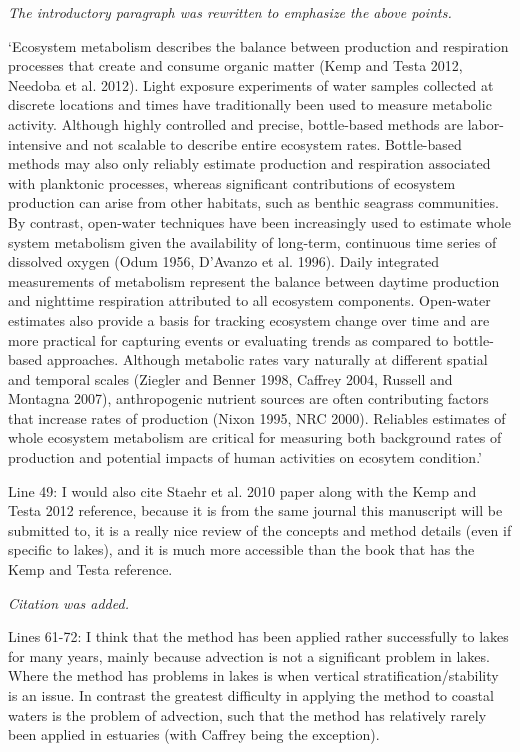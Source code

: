 \documentclass[letterpaper,12pt]{article}\usepackage[]{graphicx}\usepackage[]{color}
\begin{document}
{\it The introductory paragraph was rewritten to emphasize the above points.

`Ecosystem metabolism describes the balance between production and respiration processes that create and consume organic matter (Kemp and Testa 2012, Needoba et al. 2012).  Light exposure experiments of water samples collected at discrete locations and times have traditionally been used to measure metabolic activity.  Although highly controlled and precise, bottle-based methods are labor-intensive and not scalable to describe entire ecosystem rates.  Bottle-based methods may also only reliably estimate production and respiration associated with planktonic processes, whereas significant contributions of ecosystem production can arise from other habitats, such as benthic seagrass communities.  By contrast, open-water techniques have been increasingly used to estimate whole system metabolism given the availability of long-term, continuous time series of dissolved oxygen (Odum 1956, D'Avanzo et al. 1996). Daily integrated measurements of metabolism represent the balance between daytime production and nighttime respiration attributed to all ecosystem components.  Open-water estimates also provide a basis for tracking ecosystem change over time and are more practical for capturing events or evaluating trends as compared to bottle-based approaches. Although metabolic rates vary naturally at different spatial and temporal scales (Ziegler and Benner 1998, Caffrey 2004, Russell and Montagna 2007), anthropogenic nutrient sources are often contributing factors that increase rates of production (Nixon 1995, NRC 2000).  Reliables estimates of whole ecosystem metabolism are critical for measuring both background rates of production and potential impacts of human activities on ecosytem condition.'
}

Line 49: I would also cite Staehr et al. 2010 paper along with the Kemp and Testa 2012 reference, because it is from the same journal this manuscript will be submitted to, it is a really nice review of the concepts and method details (even if specific to lakes), and it is much more accessible than the book that has the Kemp and Testa reference.

{\it Citation was added.}

Lines 61-72: I think that the method has been applied rather successfully to lakes for many years, mainly because advection is not a significant problem in lakes. Where the method has problems in lakes is when vertical stratification/stability is an issue. In contrast the greatest difficulty in applying the method to coastal waters is the problem of advection, such that the method has relatively rarely been applied in estuaries (with Caffrey being the exception).
\end{document}
